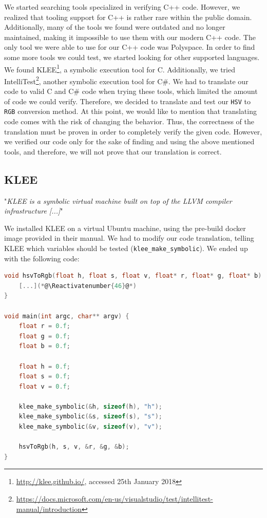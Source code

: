 \documentclass{scrreprt}
\makeatletter
\let\origthelstnumber\thelstnumber
\newcommand*\Reactivatenumber[1]{%
	\setcounter{lstnumber}{\numexpr#1-1\relax}
	\lst@AddToHook{OnNewLine}{%
		\let\thelstnumber\origthelstnumber%
		\refstepcounter{lstnumber}
	}%
}
\makeatother
\begin{document}
We started searching tools specialized in verifying C++ code. However, we realized that tooling support for C++ is rather rare within the public domain. Additionally, many of the tools we found were outdated and no longer maintained, making it impossible to use them with our modern C++ code. The only tool we were able to use for our C++ code was Polyspace.
In order to find some more tools we could test, we started looking for other supported languages. We found KLEE\footnote{\label{klee_reference}\url{http://klee.github.io/}, accessed 25th January 2018}, a symbolic execution tool for C. Additionally, we tried IntelliTest\footnote{\url{https://docs.microsoft.com/en-us/visualstudio/test/intellitest-manual/introduction}}, another symbolic execution tool for C\#. We had to translate our code to valid C and C\# code when trying these tools, which limited the amount of code we could verify. Therefore, we decided to translate and test our \texttt{HSV} to \texttt{RGB} conversion method.
At this point, we would like to mention that translating code comes with the risk of changing the behavior. Thus, the correctness of the translation must be proven in order to completely verify the given code. However, we verified our code only for the sake of finding and using the above mentioned tools, and therefore, we will not prove that our translation is correct.

\subsection{KLEE}

"\emph{KLEE is a symbolic virtual machine built on top of the LLVM compiler infrastructure [...]}"


We installed KLEE on a virtual Ubuntu machine, using the pre-build docker image provided in their manual. We had to modify our code translation, telling KLEE which variables should be tested (\texttt{klee\_make\_symbolic}). We ended up with the following code:

\begin{lstlisting}[language=C, firstnumber=21]
void hsvToRgb(float h, float s, float v, float* r, float* g, float* b) {(*@\Suppressnumber@*)
	[...](*@\Reactivatenumber{46}@*)
}

void main(int argc, char** argv) {
	float r = 0.f;
	float g = 0.f;
	float b = 0.f;
	
	float h = 0.f;
	float s = 0.f;
	float v = 0.f;
	
	klee_make_symbolic(&h, sizeof(h), "h");
	klee_make_symbolic(&s, sizeof(s), "s");
	klee_make_symbolic(&v, sizeof(v), "v");
	
	hsvToRgb(h, s, v, &r, &g, &b);
}
\end{lstlisting}
\bigskip
\end{document}
